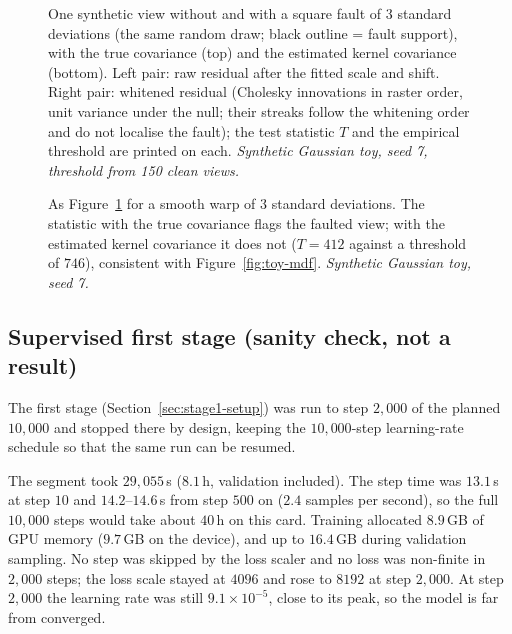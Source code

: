 \begin{figure}[!t]
  \centering
  \setlength{\figw}{\linewidth}
  \caption{One synthetic view without and with a square fault of $3$ standard deviations (the same random draw; black outline = fault support), with the true
  covariance (top) and the estimated kernel covariance (bottom). Left pair: raw residual after the fitted scale and shift. Right pair: whitened residual
  (Cholesky innovations in raster order, unit variance under the null; their streaks follow the whitening order and do not localise the fault); the test statistic
  $T$ and the empirical threshold are printed on each. \emph{Synthetic Gaussian toy, seed 7, threshold from 150 clean views.}}
  \label{fig:toy-square}
\end{figure}

\begin{figure}[!t]
  \centering
  \setlength{\figw}{\linewidth}
  \caption{As Figure~\ref{fig:toy-square} for a smooth warp of $3$ standard deviations. The statistic with the true covariance flags the faulted view; with the
  estimated kernel covariance it does not ($T=412$ against a threshold of $746$), consistent with Figure~\ref{fig:toy-mdf}. \emph{Synthetic Gaussian toy, seed 7.}}
  \label{fig:toy-warp}
\end{figure}


\subsection{Supervised first stage (sanity check, not a result)}
\label{sec:stage1}
The first stage (Section~\ref{sec:stage1-setup}) was run to step $2{,}000$ of the planned $10{,}000$ and stopped there by design, keeping the $10{,}000$-step learning-rate schedule so that the same run can be resumed.

 The segment took $29{,}055$\,s ($8.1$\,h, validation included).
The step time was $13.1$\,s at step $10$ and $14.2$--$14.6$\,s from step $500$ on ($2.4$ samples per second), so the full $10{,}000$ steps would take about $40$\,h on this card.
Training allocated $8.9$\,GB of GPU memory ($9.7$\,GB on the device), and up to $16.4$\,GB during validation sampling.
No step was skipped by the loss scaler and no loss was non-finite in $2{,}000$ steps; the loss scale stayed at $4096$ and rose to $8192$ at step $2{,}000$.
At step $2{,}000$ the learning rate was still $9.1\times10^{-5}$, close to its peak, so the model is far from converged.

